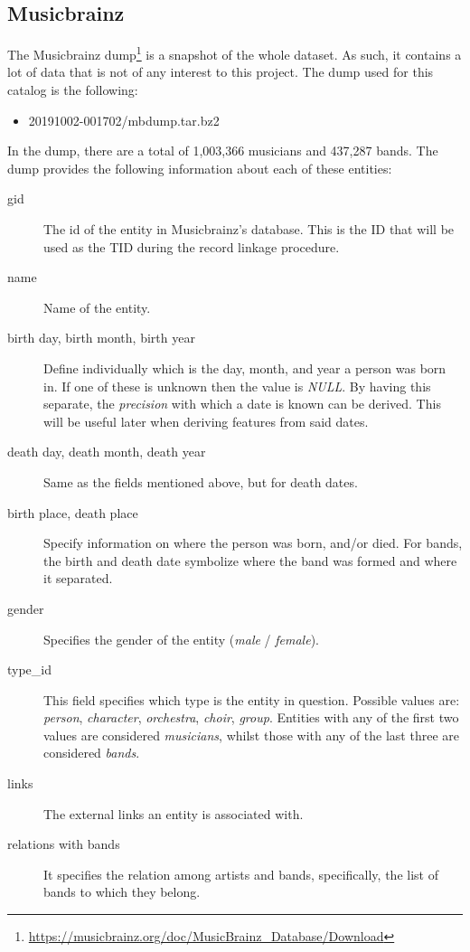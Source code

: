 \documentclass[epsfig,a4paper,11pt,titlepage,twoside,openany]{book}
\newcommand{\footurl}[1]{\footnote{\url{#1}}}
\begin{document}
\subsection{Musicbrainz}
\label{sec:shape-musicbrainz}

The Musicbrainz dump\footurl{https://musicbrainz.org/doc/MusicBrainz_Database/Download} is a snapshot of the whole dataset. As such, it contains a lot of data that is not of any interest to this project. The dump used for this catalog is the following:


\begin{itemize}
    \item 20191002-001702/mbdump.tar.bz2
\end{itemize}

In the dump, there are a total of 1,003,366 musicians and 437,287 bands. The dump provides the following information about each of these entities:

\begin{description}
\item[gid] The id of the entity in Musicbrainz's database. This is the ID that will be used as the TID during the record linkage procedure. 

\item[name] Name of the entity.

\item[birth day, birth month, birth year] Define individually which is the day, month, and year a person was born in. If one of these is unknown then the value is \textit{NULL}. By having this separate, the \textit{precision} with which a date is known can be derived. This will be useful later when deriving features from said dates. 

\item[death day, death month, death year] Same as the fields mentioned above, but for death dates.

\item[birth place, death place] Specify information on where the person was born, and/or died. For bands, the birth and death date symbolize where the band was formed and where it separated.

\item[gender] Specifies the gender of the entity (\textit{male} / \textit{female}).

\item[type\_id] This field specifies which type is the entity in question. Possible values are: \textit{person}, \textit{character}, \textit{orchestra}, \textit{choir}, \textit{group}. Entities with any of the first two values are considered \textit{musicians}, whilst those with any of the last three are considered \textit{bands}.

\item[links] The external links an entity is associated with.

\item[relations with bands] It specifies the relation among artists and bands, specifically, the list of bands to which they belong. 
\end{description}
\end{document}
